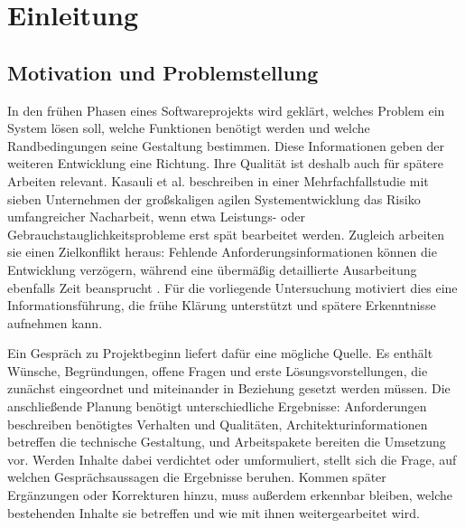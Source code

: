 
\chapter{Einleitung}
\label{chap:einleitung}

\section{Motivation und Problemstellung}
\label{sec:einleitung-motivation}

In den frühen Phasen eines Softwareprojekts wird geklärt, welches
Problem ein System lösen soll, welche Funktionen benötigt werden und
welche Randbedingungen seine Gestaltung bestimmen. Diese Informationen
geben der weiteren Entwicklung eine Richtung. Ihre Qualität ist deshalb
auch für spätere Arbeiten relevant. Kasauli et al. beschreiben in einer
Mehrfachfallstudie mit sieben Unternehmen der großskaligen agilen
Systementwicklung das Risiko umfangreicher Nacharbeit, wenn etwa
Leistungs- oder Gebrauchstauglichkeitsprobleme erst spät bearbeitet
werden. Zugleich arbeiten sie einen Zielkonflikt heraus: Fehlende
Anforderungsinformationen können die Entwicklung verzögern, während
eine übermäßig detaillierte Ausarbeitung ebenfalls Zeit beansprucht
\cite[S.~1, 19]{kasauli2021largescaleagilere}.
Für die vorliegende Untersuchung motiviert dies eine Informationsführung,
die frühe Klärung unterstützt und spätere Erkenntnisse aufnehmen kann.

Ein Gespräch zu Projektbeginn liefert dafür eine mögliche Quelle.
Es enthält Wünsche, Begründungen, offene Fragen und erste
Lösungsvorstellungen, die zunächst eingeordnet und miteinander in
Beziehung gesetzt werden müssen. Die anschließende Planung benötigt
unterschiedliche Ergebnisse: Anforderungen beschreiben benötigtes
Verhalten und Qualitäten, Architekturinformationen betreffen die technische Gestaltung,
und Arbeitspakete bereiten die Umsetzung vor. Werden Inhalte dabei
verdichtet oder umformuliert, stellt sich die Frage, auf welchen
Gesprächsaussagen die Ergebnisse beruhen. Kommen später Ergänzungen oder
Korrekturen hinzu, muss außerdem erkennbar bleiben, welche bestehenden
Inhalte sie betreffen und wie mit ihnen weitergearbeitet wird.

